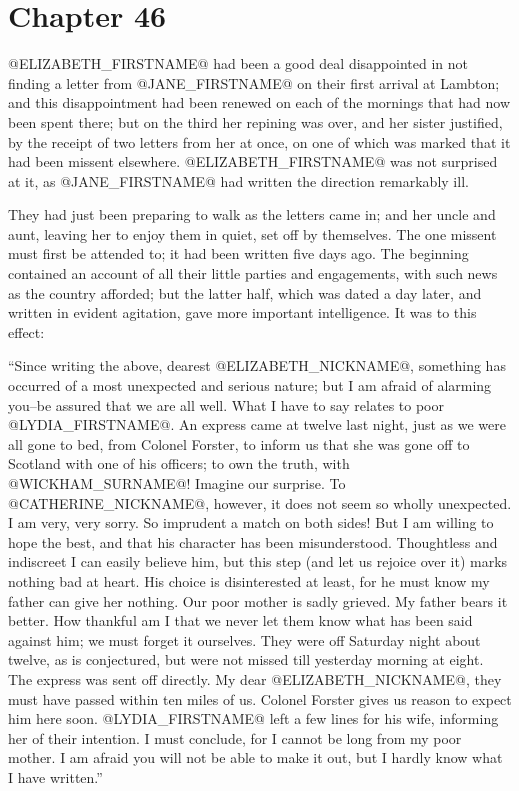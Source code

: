 \chapter*{Chapter 46}


@ELIZABETH_FIRSTNAME@ had been a good deal disappointed in not finding a letter from
@JANE_FIRSTNAME@ on their first arrival at Lambton; and this disappointment had been
renewed on each of the mornings that had now been spent there; but
on the third her repining was over, and her sister justified, by the
receipt of two letters from her at once, on one of which was marked that
it had been missent elsewhere. @ELIZABETH_FIRSTNAME@ was not surprised at it, as
@JANE_FIRSTNAME@ had written the direction remarkably ill.

They had just been preparing to walk as the letters came in; and
her uncle and aunt, leaving her to enjoy them in quiet, set off by
themselves. The one missent must first be attended to; it had been
written five days ago. The beginning contained an account of all their
little parties and engagements, with such news as the country afforded;
but the latter half, which was dated a day later, and written in evident
agitation, gave more important intelligence. It was to this effect:

``Since writing the above, dearest @ELIZABETH_NICKNAME@, something has occurred of a
most unexpected and serious nature; but I am afraid of alarming you--be
assured that we are all well. What I have to say relates to poor @LYDIA_FIRSTNAME@.
An express came at twelve last night, just as we were all gone to bed,
from Colonel Forster, to inform us that she was gone off to Scotland
with one of his officers; to own the truth, with @WICKHAM_SURNAME@! Imagine our
surprise. To @CATHERINE_NICKNAME@, however, it does not seem so wholly unexpected. I am
very, very sorry. So imprudent a match on both sides! But I am willing
to hope the best, and that his character has been misunderstood.
Thoughtless and indiscreet I can easily believe him, but this step
(and let us rejoice over it) marks nothing bad at heart. His choice is
disinterested at least, for he must know my father can give her nothing.
Our poor mother is sadly grieved. My father bears it better. How
thankful am I that we never let them know what has been said against
him; we must forget it ourselves. They were off Saturday night about
twelve, as is conjectured, but were not missed till yesterday morning at
eight. The express was sent off directly. My dear @ELIZABETH_NICKNAME@, they must have
passed within ten miles of us. Colonel Forster gives us reason to expect
him here soon. @LYDIA_FIRSTNAME@ left a few lines for his wife, informing her of
their intention. I must conclude, for I cannot be long from my poor
mother. I am afraid you will not be able to make it out, but I hardly
know what I have written.''

